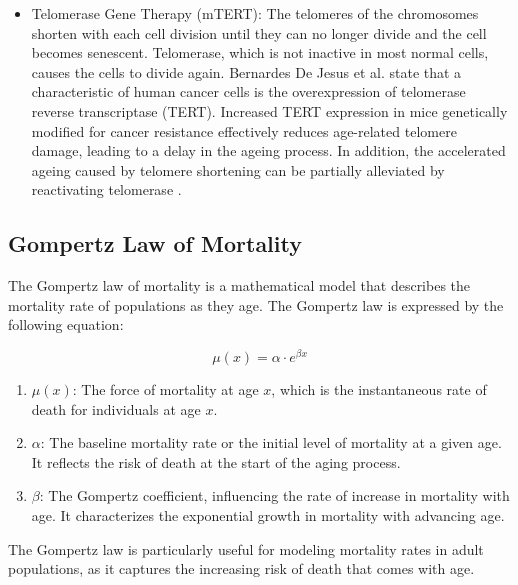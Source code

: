 \begin{itemize}
    \item Telomerase Gene Therapy (mTERT): The telomeres of the chromosomes shorten with each cell division until they can no longer divide and the cell becomes senescent. Telomerase, which is not inactive in most normal cells, causes the cells to divide again. \citet{bernardes2012telomerase}Bernardes De Jesus et al. state that a characteristic of human cancer cells is the overexpression of telomerase reverse transcriptase (TERT). Increased TERT expression in mice genetically modified for cancer resistance effectively reduces age-related telomere damage, leading to a delay in the ageing process. In addition, the accelerated ageing caused by telomere shortening can be partially alleviated by reactivating telomerase \cite{bernardes2012telomerase}. 
\end{itemize}

\subsection{Gompertz Law of Mortality}
The Gompertz law of mortality \cite{gompertz} is a mathematical model that describes the mortality rate of populations as they age. The Gompertz law is expressed by the following equation:

\[ \mu(x) = \alpha \cdot e^{\beta x} \]
\begin{enumerate}
\item  \( \mu(x) \): The force of mortality at age \( x \), which is the instantaneous rate of death for individuals at age \( x \).

\item \( \alpha \): The baseline mortality rate or the initial level of mortality at a given age. It reflects the risk of death at the start of the aging process.

\item \( \beta \): The Gompertz coefficient, influencing the rate of increase in mortality with age. It characterizes the exponential growth in mortality with advancing age.
\end{enumerate}

The Gompertz law is particularly useful for modeling mortality rates in adult populations, as it captures the increasing risk of death that comes with age.
